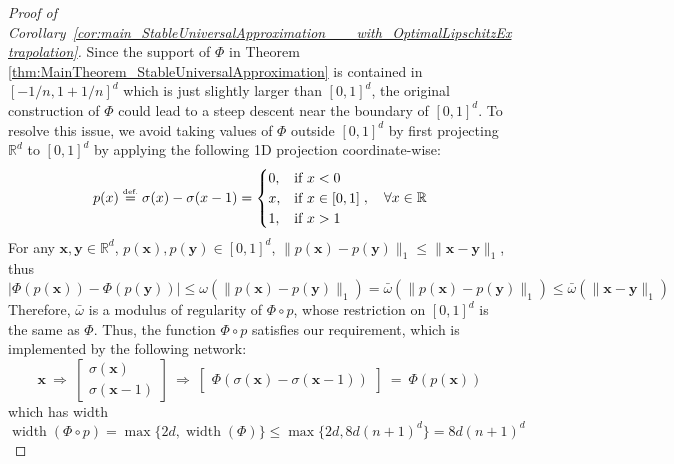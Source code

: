 \documentclass{article}
\numberwithin{equation}{section}
\theoremstyle{definition}
\newcommand{\eqdef}{\ensuremath{\stackrel{\mbox{\upshape\tiny def.}}{=}}}
\begin{document}
\begin{proof}[{Proof of Corollary~\ref{cor:main_StableUniversalApproximation___with_OptimalLipschitzExtrapolation}}]
Since the support of $\Phi$ in Theorem \ref{thm:MainTheorem_StableUniversalApproximation} is contained in $[-1/n,1+1/n]^d$ which is just slightly larger than $[0,1]^d$, the original construction of $\Phi$ could lead to a steep descent near the boundary of $[0,1]^d$. To resolve this issue, we avoid taking values of $\Phi$ outside $[0,1]^d$ by first projecting $\mathbb{R}^d$ to $[0,1]^d$ by applying the following 1D projection coordinate-wise: 
\begin{equation}
\label{eq:projection_l1}
    p(x) \eqdef \sigma(x) - \sigma(x-1)
    = 
    \begin{cases}
        0, & \text{if } x < 0  \\
        x, & \text{if } x \in [0,1]  \\
        1, & \text{if } x > 1  \\
    \end{cases},
    \quad \forall x \in \mathbb{R}
\end{equation}
For any $\mathbf{x},\mathbf{y}\in\mathbb{R}^d$, $p(\mathbf{x}) , p(\mathbf{y}) \in [0,1]^d$, $\|p(\mathbf{x}) - p(\mathbf{y})\|_1 \le \|\mathbf{x} - \mathbf{y}\|_1$, thus
\[
    | \Phi(p(\mathbf{x})) - \Phi(p(\mathbf{y})) |
    \le
    \omega( \| p(\mathbf{x}) - p(\mathbf{y}) \|_1 )
    =
    \bar{\omega}( \| p(\mathbf{x}) - p(\mathbf{y}) \|_1 )
    \le
    \bar{\omega}( \| \mathbf{x} - \mathbf{y} \|_1 )
\]
Therefore, $\bar{\omega}$ is a modulus of regularity of $\Phi\circ p$, whose restriction on $[0,1]^d$ is the same as $\Phi$. Thus, the function $\Phi\circ p$ satisfies our requirement, which is implemented by the following network: 
\begin{equation}
\label{eq:construction_of_Phi_global}
    \mathbf{x}
    \ \Longrightarrow \ 
    \begin{bmatrix} \sigma(\mathbf{x}) \\ \sigma(\mathbf{x}-1) \end{bmatrix}
    \ \Longrightarrow \ 
    \begin{bmatrix} 
        \Phi ( \sigma(\mathbf{x}) - \sigma(\mathbf{x}-1) )
    \end{bmatrix}
    \ = \
    \Phi ( p(\mathbf{x}) )
\end{equation}
which has width 
\[
    \operatorname{width}(\Phi\circ p)
    =
    \max\{ 2d, \operatorname{width}(\Phi) \}
    \le
    \max\{ 2d, 8d(n+1)^d \}
    =
    8d(n+1)^d
\]
\end{proof}
\end{document}
